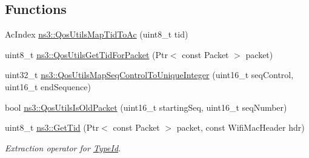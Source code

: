 \subsection*{Functions}
\begin{DoxyCompactItemize}
\item 
Ac\+Index \hyperlink{group__wifi_ga4e36efcff6dd83eaee42e1af0de43d48}{ns3\+::\+Qos\+Utils\+Map\+Tid\+To\+Ac} (uint8\+\_\+t tid)
\item 
uint8\+\_\+t \hyperlink{group__wifi_gaa7ad20082f78b63633d0557d24927150}{ns3\+::\+Qos\+Utils\+Get\+Tid\+For\+Packet} (Ptr$<$ const Packet $>$ packet)
\item 
uint32\+\_\+t \hyperlink{group__wifi_ga841296fae895cac77a0e14183b8134e0}{ns3\+::\+Qos\+Utils\+Map\+Seq\+Control\+To\+Unique\+Integer} (uint16\+\_\+t seq\+Control, uint16\+\_\+t end\+Sequence)
\item 
bool \hyperlink{group__wifi_ga5cb9ea723837c5a036e622612f2d0bb0}{ns3\+::\+Qos\+Utils\+Is\+Old\+Packet} (uint16\+\_\+t starting\+Seq, uint16\+\_\+t seq\+Number)
\item 
uint8\+\_\+t \hyperlink{group__wifi_ga92cc18e2c5aa6bed3728860bbad76ff8}{ns3\+::\+Get\+Tid} (Ptr$<$ const Packet $>$ packet, const Wifi\+Mac\+Header hdr)
\begin{DoxyCompactList}\small\item\em Extraction operator for \hyperlink{classns3_1_1TypeId}{Type\+Id}. \end{DoxyCompactList}\end{DoxyCompactItemize}
